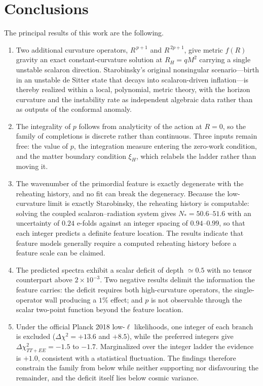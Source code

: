 \documentclass[aps,prd,twocolumn,superscriptaddress,nofootinbib,longbibliography]{revtex4-2}
\begin{document}
\section{Conclusions}
\label{sec:conclusions}
The principal results of this work are the following.

\begin{enumerate}
\item Two additional curvature operators, $R^{\,p+1}$ and $R^{\,2p+1}$, give
metric $f(R)$ gravity an exact constant-curvature solution at $R_H=qM^2$
carrying a single unstable scalaron direction. Starobinsky's original
nonsingular scenario---birth in an unstable de Sitter state that decays into
scalaron-driven inflation---is thereby realized within a local, polynomial,
metric theory, with the horizon curvature and the instability rate as
independent algebraic data rather than as outputs of the conformal anomaly.

\item The integrality of $p$ follows from analyticity of the action at
$R=0$, so the family of completions is discrete rather than continuous.
Three inputs remain free: the value of $p$, the integration measure
entering the zero-work condition, and the matter boundary condition
$\xi_H$, which relabels the ladder rather than moving it.

\item The wavenumber of the primordial feature is exactly degenerate with
the reheating history, and no fit can break the degeneracy. Because the
low-curvature limit is exactly Starobinsky, the reheating history is
computable: solving the coupled scalaron--radiation system gives
$N_*=50.6$--$51.6$ with an uncertainty of $0.24$ e-folds against an integer
spacing of $0.94$--$0.99$, so that each integer predicts a definite feature
location. The results indicate that feature models generally require a
computed reheating history before a feature scale can be claimed.

\item The predicted spectra exhibit a scalar deficit of depth $\simeq0.5$
with no tensor counterpart above $2\times10^{-3}$. Two negative results
delimit the information the feature carries: the deficit requires both
high-curvature operators, the single-operator wall producing a $1\%$ effect;
and $p$ is not observable through the scalar two-point function beyond the
feature location.

\item Under the official Planck 2018 low-$\ell$ likelihoods, one integer of
each branch is excluded ($\Delta\chi^2=+13.6$ and $+8.5$), while the
preferred integers give $\Delta\chi^2_{TT+EE}=-1.5$ to $-1.7$. Marginalized
over the integer ladder the evidence is $+1.0$, consistent with a
statistical fluctuation. The findings therefore constrain the family from
below while neither supporting nor disfavouring the remainder, and the
deficit itself lies below cosmic variance.


\end{enumerate}
\end{document}
